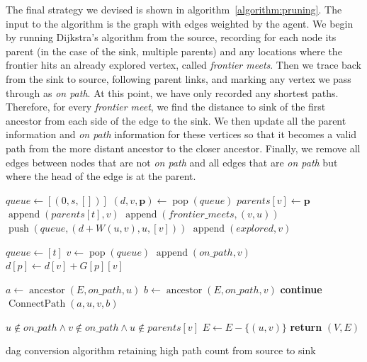 The final strategy we devised is shown in algorithm~\ref{algorithm:pruning}. The input to the algorithm is the graph with edges weighted by the agent. We begin by running Dijkstra's algorithm from the source, recording for each node its parent (in the case of the sink, multiple parents) and any locations where the frontier hits an already explored vertex, called \emph{frontier meets}. Then we trace back from the sink to source, following parent links, and marking any vertex we pass through as \emph{on path}. At this point, we have only recorded any shortest paths. Therefore, for every \emph{frontier meet}, we find the distance to sink of the first ancestor from each side of the edge to the sink. We then update all the parent information and \emph{on path} information for these vertices so that it becomes a valid path from the more distant ancestor to the closer ancestor. Finally, we remove all edges between nodes that are not \emph{on path} and all edges that are \emph{on path} but where the head of the edge is at the parent.

\begin{algorithm}[t]
\small
\begin{algorithmic}
  \State $queue \gets [(0, s, [])]$
    \State $(d, v, \bm{p}) \gets \operatorname{pop}(queue)$
    \State $parents[v] \gets \bm{p}$
        \State $\operatorname{append}(parents[t], v)$
        \State $\operatorname{append}(frontier\_meets, (v, u))$
      \Else
        \State $\operatorname{push}(queue, (d + W(u,v), u, [v]))$
      \EndIf
    \EndFor
    \State $\operatorname{append}(explored, v)$
  \EndWhile

  \State $queue \gets [t]$
    \State $v \gets \operatorname{pop}(queue)$
    \State $\operatorname{append}(on\_path, v)$
      \State $d[p] \gets d[v] + G[p][v]$
    \EndFor
  \EndWhile

    \State $a \gets \operatorname{ancestor}(E, on\_path, u)$
    \State $b \gets \operatorname{ancestor}(E, on\_path, v)$
      \State \textbf{continue}
    \EndIf
    \State $\operatorname{ConnectPath}(a, u, v, b)$
  \EndFor

    \If $u \notin on\_path \wedge v \notin on\_path \wedge u \notin parents[v]$
      \State $E \gets E - \{(u, v)\}$
    \EndIf
  \EndFor
  \State \textbf{return} $(V, E)$
\EndFunction
\end{algorithmic}
\caption{\ac{dag} conversion algorithm retaining high path count from source to sink}
\label{algorithm:pruning}
\end{algorithm}

